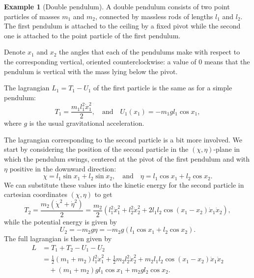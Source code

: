 \documentclass[english,fontsize=11pt,paper=b5]{scrbook}
\numberwithin{equation}{chapter}
\theoremstyle{definition}
\newtheorem{example}{Example}[chapter]
\begin{document}
    \begin{example}[Double pendulum]\label{ex:2pendulum}
      A double pendulum consists of two point particles of masses $m_1$ and $m_2$, connected by massless rods of lengths $l_1$ and $l_2$. The first pendulum is attached to the ceiling by a fixed pivot while the second one is attached to the point particle of the first pendulum.

      Denote $x_1$ and $x_2$ the angles that each of the pendulums make with respect to the corresponding vertical, oriented counterclockwise: a value of $0$ means that the pendulum is vertical with the mass lying below the pivot.

      The lagrangian $L_1 = T_1 - U_1$ of the first particle is the same as for a simple pendulum:
      \begin{equation}
        T_1 = \frac{m_1 l_1^2 \dot x_1^2}2,
        \quad\mbox{and}\quad
        U_1(x_1) = -m_1 g l_1 \cos x_1,
      \end{equation}
      where $g$ is the usual gravitational acceleration.

      The lagrangian corresponding to the second particle is a bit more involved. We start by considering the position of the second particle in the $(\chi,\eta)$-plane in which the pendulum swings, centered at the pivot of the first pendulum and with $\eta$ positive in the downward direction:
      \begin{equation}
        \chi = l_1\sin x_1 + l_2\sin x_2,
        \quad\mbox{and}\quad
        \eta = l_1\cos x_1 + l_2\cos x_2.
      \end{equation}
      We can substitute these values into the kinetic energy for the second particle in cartesian coordinates $(\chi,\eta)$ to get
      \begin{equation}
        T_2 = \frac {m_2 (\dot\chi^2 + \dot\eta^2)}2
        = \frac {m_2}2 \left(
          l_1^2 \dot x_1^2 + l_2^2 \dot x_2^2
          + 2l_1l_2 \cos(x_1 -x_2)\dot x_1 \dot x_2
        \right),
      \end{equation}
      while the potential energy is given by
      \begin{equation}
        U_2 = -m_2 g \eta = -m_2g (l_1\cos x_1 + l_2\cos x_2).
      \end{equation}
      The full lagrangian is then given by
      \begin{align}
        L & = T_1 + T_2 - U_1 - U_2                 \\
          & = \frac12 (m_1 + m_2)  l_1^2 \dot x_1^2
          + \frac 12 m_2 l_2^2 \dot x_2^2
          + m_2l_1l_2 \cos(x_1 -x_2)\dot x_1 \dot x_2 \\
          & \quad+ (m_1 + m_2) g l_1 \cos x_1
          + m_2gl_2\cos x_2.
      \end{align}


\end{example}
\end{document}
